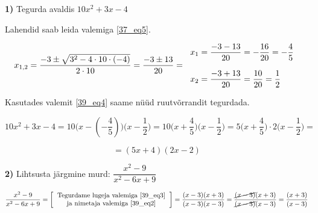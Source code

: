 \begin{center}
{{{\begin{flushleft}
\vspace{2mm}
\hspace{5mm}
\textbf{1)} Tegurda avaldis $10x^{2}+3x-4$

\vspace{2mm}
\hspace{5mm}
Lahendid saab leida valemiga \ref{37_eq5}.

\[ x_{1,2}= \dfrac{-3 \pm \sqrt{3^{2}-4 \cdot 10 \cdot (-4)}}{2 \cdot 10} = \dfrac{-3 \pm 13}{20}= \begin{tabular}{l}
$x_{1}=\dfrac{-3-13}{20}=-\dfrac{16}{20}=-\dfrac{4}{5}$\\
\\
$x_{2}=\dfrac{-3+13}{20}=\dfrac{10}{20}=\dfrac{1}{2}$
\end{tabular} \]

\hspace{5mm}
Kasutades valemit \ref{39_eq4} saame nüüd ruutvõrrandit tegurdada.

\[ 10x^{2}+3x-4 = 10\Big( x-\left(-\dfrac{4}{5} \right) \Big)\Big( x-\dfrac{1}{2} \Big)= 10 \Big( x + \dfrac{4}{5} \Big) \Big( x-\dfrac{1}{2} \Big)= 5 \Big( x+ \dfrac{4}{5} \Big) \cdot 2 \Big( x-\dfrac{1}{2} \Big)= \]

\[=(5x+4)(2x-2) \]

\vspace{2mm}
\hspace{5mm}
\textbf{2)} Lihtsusta järgmine murd: $\dfrac{x^{2}-9}{x^{2}-6x+9}$ 


\vspace{2mm}
\hspace{5mm}
\[ \dfrac{x^{2}-9}{x^{2}-6x+9} = \left[ \begin{tabular}{c}
Tegurdame lugeja valemiga \ref{39_eq3}\\
ja nimetaja valemiga \ref{39_eq2}
\end{tabular} \right] = \dfrac{(x-3)(x+3)}{(x-3)(x-3)}= \dfrac{\cancel{(x-3)}(x+3)}{\cancel{(x-3)}(x-3)}=\dfrac{(x+3)}{(x-3)} \]

\end{flushleft}
}}}
\end{center}

